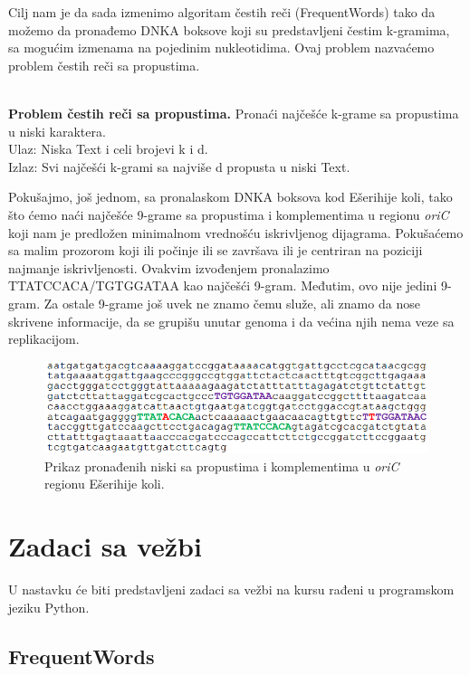 Cilj nam je da sada izmenimo algoritam čestih reči (FrequentWords) tako da možemo da pronađemo DNKA boksove koji su predstavljeni čestim k-gramima, sa mogućim izmenama na pojedinim nukleotidima. Ovaj problem nazvaćemo problem čestih reči sa propustima.\\\\
\begin{tcolorbox}
\textbf{Problem čestih reči sa propustima.} Pronaći najčešće k-grame sa
propustima u niski karaktera.\\
Ulaz: Niska Text i celi brojevi k i d.\\
Izlaz: Svi najčešći k-grami sa najviše d propusta u niski Text. \\
\end{tcolorbox}
Pokušajmo, još jednom, sa pronalaskom DNKA boksova kod Ešerihije koli, tako što ćemo naći najčešće 9-grame sa propustima i komplementima u regionu \textit{oriC} koji nam je predložen minimalnom vrednošću iskrivljenog dijagrama. Pokušaćemo sa malim prozorom koji ili počinje ili se završava ili je centriran na poziciji najmanje iskrivljenosti. Ovakvim izvođenjem pronalazimo TTATCCACA/TGTGGATAA kao najčešći 9-gram. Međutim, ovo nije jedini 9-gram. Za ostale 9-grame još uvek ne znamo čemu služe, ali znamo da nose skrivene informacije, da se grupišu unutar genoma i da većina njih nema veze sa replikacijom. 

\begin{figure}[H]
\caption{Prikaz pronađenih niski sa propustima i komplementima u \textit{oriC} regionu Ešerihije koli.}
\centering
\includegraphics[width=1\textwidth]{poglavlja/1/slike/ecoli_poslednji.png}
\end{figure} 

\newpage

\section{Zadaci sa vežbi}
U nastavku će biti predstavljeni zadaci sa vežbi na kursu rađeni u programskom jeziku Python.

\subsection{FrequentWords}

